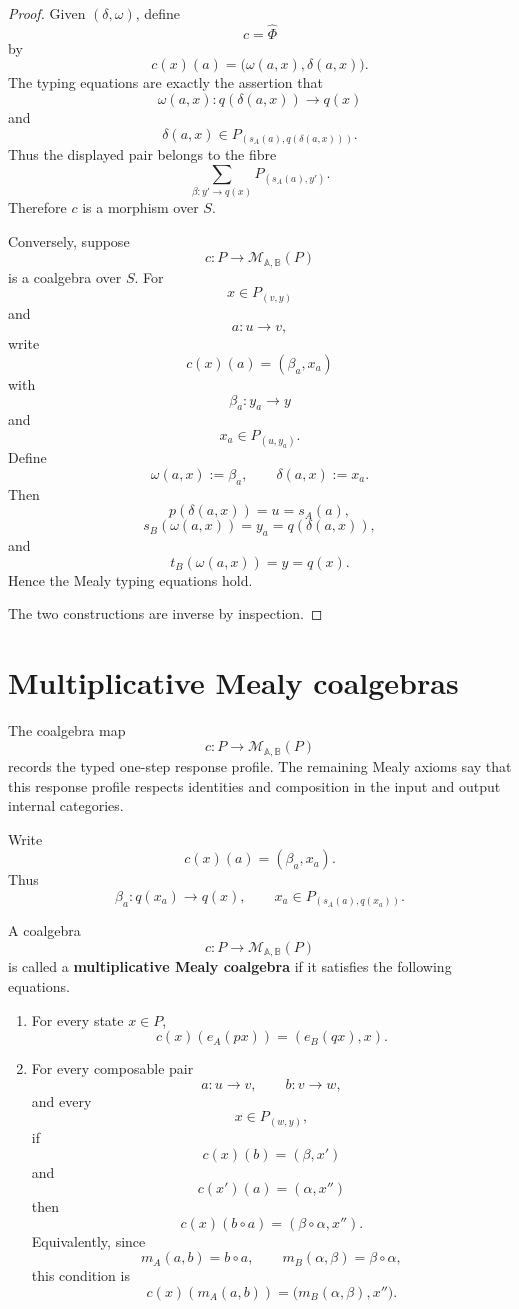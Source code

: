 \begin{proof}
Given \((\delta,\omega)\), define
\[
c=\widehat{\Phi}
\]
by
\[
c(x)(a)=\bigl(\omega(a,x),\delta(a,x)\bigr).
\]
The typing equations are exactly the assertion that
\[
\omega(a,x):q(\delta(a,x))\to q(x)
\]
and
\[
\delta(a,x)\in P_{(s_A(a),q(\delta(a,x)))}.
\]
Thus the displayed pair belongs to the fibre
\[
\sum_{\beta:y'\to q(x)}
P_{(s_A(a),y')}.
\]
Therefore \(c\) is a morphism over \(S\).

Conversely, suppose
\[
c:P\to\mathcal M_{\mathbb A,\mathbb B}(P)
\]
is a coalgebra over \(S\). For
\[
x\in P_{(v,y)}
\]
and
\[
a:u\to v,
\]
write
\[
c(x)(a)=(\beta_a,x_a)
\]
with
\[
\beta_a:y_a\to y
\]
and
\[
x_a\in P_{(u,y_a)}.
\]
Define
\[
\omega(a,x):=\beta_a,
\qquad
\delta(a,x):=x_a.
\]
Then
\[
p(\delta(a,x))=u=s_A(a),
\]
\[
s_B(\omega(a,x))=y_a=q(\delta(a,x)),
\]
and
\[
t_B(\omega(a,x))=y=q(x).
\]
Hence the Mealy typing equations hold.

The two constructions are inverse by inspection.
\end{proof}

\section{Multiplicative Mealy coalgebras}
\label{sec:multiplicative-mealy-coalgebras}

The coalgebra map
\[
c:P\to\mathcal M_{\mathbb A,\mathbb B}(P)
\]
records the typed one-step response profile. The remaining Mealy axioms
say that this response profile respects identities and composition in the
input and output internal categories.

Write
\[
c(x)(a)=(\beta_a,x_a).
\]
Thus
\[
\beta_a:q(x_a)\to q(x),
\qquad
x_a\in P_{(s_A(a),q(x_a))}.
\]

\begin{definition}
\label{def:multiplicative-mealy-coalgebra}
A coalgebra
\[
c:P\to\mathcal M_{\mathbb A,\mathbb B}(P)
\]
is called a \textbf{multiplicative Mealy coalgebra} if it satisfies the
following equations.

\begin{enumerate}
\item For every state \(x\in P\),
\[
c(x)(e_A(px))=(e_B(qx),x).
\]

\item For every composable pair
\[
a:u\to v,
\qquad
b:v\to w,
\]
and every
\[
x\in P_{(w,y)},
\]
if
\[
c(x)(b)=(\beta,x')
\]
and
\[
c(x')(a)=(\alpha,x'')
\]
then
\[
c(x)(b\circ a)=(\beta\circ\alpha,x'').
\]
Equivalently, since
\[
m_A(a,b)=b\circ a,
\qquad
m_B(\alpha,\beta)=\beta\circ\alpha,
\]
this condition is
\[
c(x)(m_A(a,b))
=
\bigl(m_B(\alpha,\beta),x''\bigr).
\]
\end{enumerate}
\end{definition}

